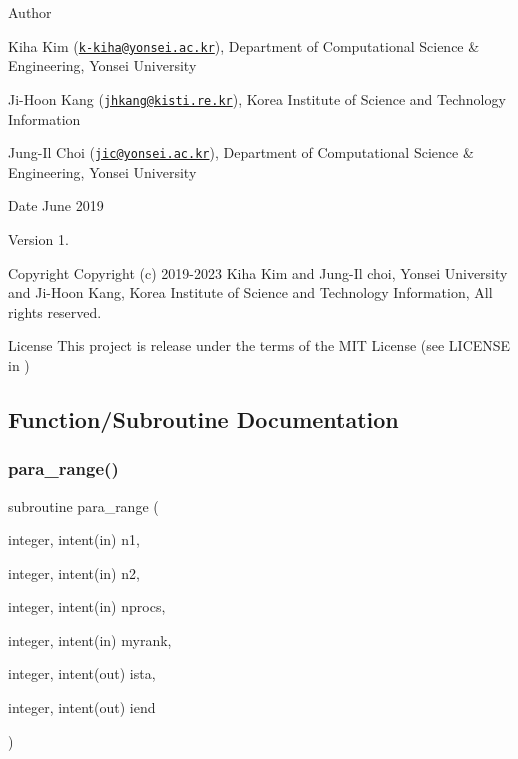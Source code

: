 \begin{DoxyAuthor}{Author}

\begin{DoxyItemize}
\item Kiha Kim (\href{mailto:k-kiha@yonsei.ac.kr}{\tt k-\/kiha@yonsei.\+ac.\+kr}), Department of Computational Science \& Engineering, Yonsei University
\item Ji-\/\+Hoon Kang (\href{mailto:jhkang@kisti.re.kr}{\tt jhkang@kisti.\+re.\+kr}), Korea Institute of Science and Technology Information
\item Jung-\/\+Il Choi (\href{mailto:jic@yonsei.ac.kr}{\tt jic@yonsei.\+ac.\+kr}), Department of Computational Science \& Engineering, Yonsei University
\end{DoxyItemize}
\end{DoxyAuthor}
\begin{DoxyDate}{Date}
June 2019 
\end{DoxyDate}
\begin{DoxyVersion}{Version}
1. 
\end{DoxyVersion}
\begin{DoxyParagraph}{Copyright}
Copyright (c) 2019-\/2023 Kiha Kim and Jung-\/\+Il choi, Yonsei University and Ji-\/\+Hoon Kang, Korea Institute of Science and Technology Information, All rights reserved. 
\end{DoxyParagraph}
\begin{DoxyParagraph}{License }
This project is release under the terms of the M\+IT License (see L\+I\+C\+E\+N\+SE in ) 
\end{DoxyParagraph}


\subsection{Function/\+Subroutine Documentation}
\mbox{\label{para__range_8f90_ab75ab386311975aa4ff7cac06798fcd4}} 
\subsubsection{\texorpdfstring{para\+\_\+range()}{para\_range()}}
{\footnotesize\ttfamily subroutine para\+\_\+range (\begin{DoxyParamCaption}\item[{integer, intent(in)}]{n1,  }\item[{integer, intent(in)}]{n2,  }\item[{integer, intent(in)}]{nprocs,  }\item[{integer, intent(in)}]{myrank,  }\item[{integer, intent(out)}]{ista,  }\item[{integer, intent(out)}]{iend }\end{DoxyParamCaption})}



